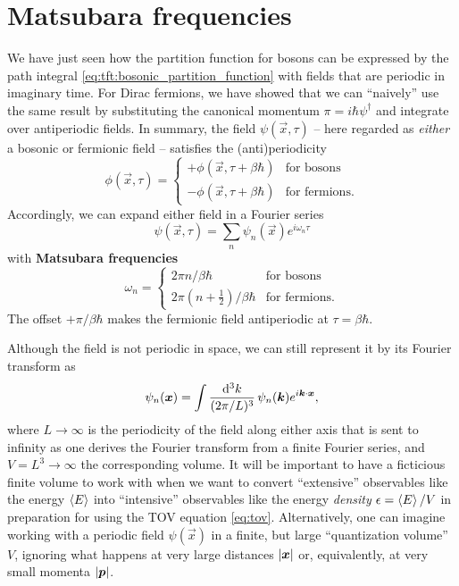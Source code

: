 \section{Matsubara frequencies}

We have just seen how the partition function for bosons can be expressed by the path integral \eqref{eq:tft:bosonic_partition_function} with fields that are periodic in imaginary time.
For Dirac fermions, we have showed that we can ``naively'' use the same result by substituting the canonical momentum $\pi = i \hbar \psi^\dagger$ and integrate over antiperiodic fields.
In summary, the field $\psi(\vec{x}, \tau)$ -- here regarded as \emph{either} a bosonic or fermionic field -- satisfies the (anti)periodicity
\begin{equation}
	\phi(\vec{x}, \tau) = \begin{cases}
						      + \phi(\vec{x}, \tau + \beta \hbar) & \text{for bosons} \\
						      - \phi(\vec{x}, \tau + \beta \hbar) & \text{for fermions} .
	                      \end{cases}
\label{eq:tft:periodicity}
\end{equation}
Accordingly, we can expand either field in a Fourier series
\begin{equation}
	\psi(\vec{x}, \tau) = \sum_n \psi_n(\vec{x}) e^{i \omega_n \tau}
\end{equation}
with \textbf{Matsubara frequencies} 
\begin{equation}
	\omega_n = \begin{cases}
			       2 \pi n / \beta \hbar    & \text{for bosons} \\
				   2 \pi (n+\frac12) / \beta \hbar & \text{for fermions} .
	           \end{cases}
\label{eq:tft:matsubara_frequencies}
\end{equation}
The offset $+\pi / \beta \hbar$ makes the fermionic field antiperiodic at $\tau = \beta \hbar$.

Although the field is not periodic in space, we can still represent it by its Fourier transform as
\begin{equation}
	\psi_n({\bm{x}}) = \int \frac{\mathop{}\!\mathrm{d}^3 k}{(2 \pi / L)^3} \, \psi_n({\bm{k}}) e^{i {\bm{k}} \cdot {\bm{x}}},
\label{eq:tft:mathematical_fourier_expansion}
\end{equation}
where $L \rightarrow \infty$ is the periodicity of the field along either axis that is sent to infinity as one derives the Fourier transform from a finite Fourier series, and $V = L^3 \rightarrow \infty$ the corresponding volume.
It will be important to have a ficticious finite volume to work with when we want to convert ``extensive'' observables like the energy $\left< E \right>$ into ``intensive'' observables like the energy \emph{density} $\epsilon = \left< E \right> / V$ in preparation for using the TOV equation \eqref{eq:tov}.
Alternatively, one can imagine working with a periodic field $\psi(\vec{x})$ in a finite, but large ``quantization volume'' $V$, ignoring what happens at very large distances $\lvert {\bm{x}} \rvert$ or, equivalently, at very small momenta $\lvert {\bm{p}} \rvert$. 

